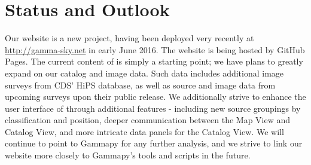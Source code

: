 \section{Status and Outlook}

%
%


Our website is a new project, having been deployed very recently at \url{http://gamma-sky.net} in early June 2016. The website is being hosted by GitHub Pages. The current content of \gammasky is simply a starting point; we have plans to greatly expand on our catalog and image data. Such data includes additional image surveys from CDS' HiPS database, as well as source and image data from upcoming surveys upon their public release. We additionally strive to enhance the user interface of \gammasky through additional features - including new source groupings by classification and position, deeper communication between the Map View and Catalog View, and more intricate data panels for the Catalog View. We will continue to point to Gammapy for any further analysis, and we strive to link our website more closely to Gammapy's tools and scripts in the future.
